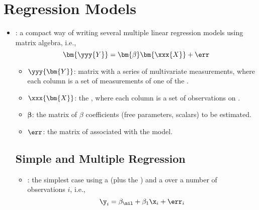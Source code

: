 \section{Regression Models}
\begin{itemize}
  \item {}: a compact way of writing several multiple linear regression models using matrix algebra, i.e.,
  \[%
  \bm{\yyy{Y}} = \bm{\beta}\bm{\xxx{X}} + \err
  \]%
  \begin{itemize}
    \item \(\yyy{\bm{Y}}\): matrix with a series of multivariate measurements, where each column is a set of measurements of one of the .
    \item \(\xxx{\bm{X}}\): the , where each column is a set of observations on .
    \item \(\bm{\beta}\): the matrix of \(\beta \) coefficients (free parameters, scalars) to be estimated.
    \item \(\displaystyle\err\): the matrix of  associated with the model.
  \end{itemize}
  
  \subsection{Simple and Multiple Regression}
  \begin{itemize}
    \item {}: the simplest case using a  (plus the \hyperref[Subsection: Model-Fitting]{}) and a  over a number of observations \(i\), i.e.,
    \[%
    \y_i = \beta_\nil + \beta_1\x_i + \err_i
    \]%
    

\end{itemize}
\end{itemize}
